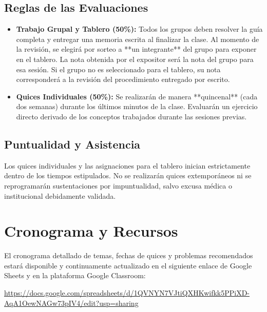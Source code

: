 \documentclass[11pt, letterpaper]{article}
\begin{document}
    \subsection{Reglas de las Evaluaciones}
    
    \begin{itemize}
        
        \item \textbf{Trabajo Grupal y Tablero (50\%):} Todos los grupos deben resolver la guía completa y entregar una memoria escrita al finalizar la clase. Al momento de la revisión, se elegirá por sorteo a **un integrante** del grupo para exponer en el tablero. La nota obtenida por el expositor será la nota del grupo para esa sesión. Si el grupo no es seleccionado para el tablero, su nota corresponderá a la revisión del procedimiento entregado por escrito.
        
        \item \textbf{Quices Individuales (50\%):} Se realizarán de manera **quincenal** (cada dos semanas) durante los últimos minutos de la clase. Evaluarán un ejercicio directo derivado de los conceptos trabajados durante las sesiones previas.
        
    \end{itemize}
    
    \subsection{Puntualidad y Asistencia}
    
    Los quices individuales y las asignaciones para el tablero inician estrictamente dentro de los tiempos estipulados. No se realizarán quices extemporáneos ni se reprogramarán sustentaciones por impuntualidad, salvo excusa médica o institucional debidamente validada.
    
    \section{Cronograma y Recursos}
    
    El cronograma detallado de temas, fechas de quices y problemas recomendados estará disponible y continuamente actualizado en el siguiente enlace de Google Sheets y en la plataforma Google Classroom:
    
    \url{https://docs.google.com/spreadsheets/d/1QVNYN7VJtiQXHKwifkk5PPiXD-AqA1OewNAGw73pIV4/edit?usp=sharing}
    
\end{document}
